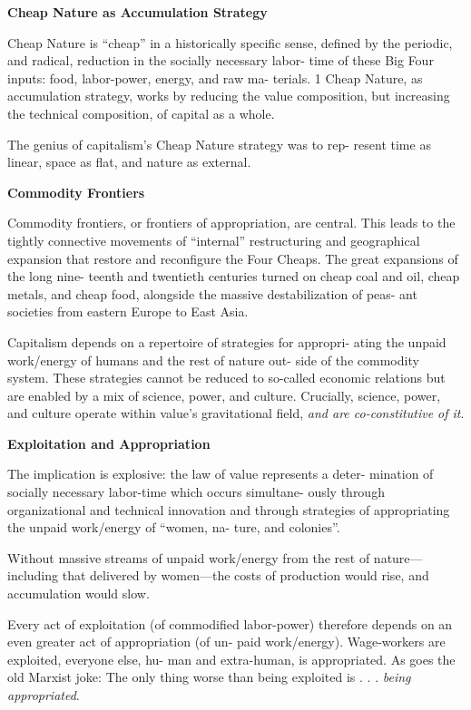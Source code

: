 \documentclass[
]{book}
\begin{document}
\textbf{Cheap Nature as Accumulation Strategy}

Cheap Nature is ``cheap'' in a historically specific sense, defined
by the periodic, and radical, reduction in the socially necessary labor-
time of these Big Four inputs: food, labor-power, energy, and raw ma-
terials. 1 Cheap Nature, as accumulation strategy, works by reducing
the value composition, but increasing the technical composition, of
capital as a whole.

The genius of capitalism's Cheap Nature strategy was to rep-
resent time as linear, space as flat, and nature as external.

\textbf{Commodity Frontiers}

Commodity frontiers, or frontiers of appropriation, are central.
This leads to the tightly connective movements of
``internal'' restructuring and geographical expansion that restore and
reconfigure the Four Cheaps. The great expansions of the long nine-
teenth and twentieth centuries turned on cheap coal and oil, cheap
metals, and cheap food, alongside the massive destabilization of peas-
ant societies from eastern Europe to East Asia.

Capitalism depends on a repertoire of strategies for appropri-
ating the unpaid work/energy of humans and the rest of nature out-
side of the commodity system. These strategies cannot be reduced to
so-called economic relations but are enabled by a mix of science,
power, and culture. Crucially, science, power, and culture operate
within value's gravitational field, \emph{and are co-constitutive of it}.

\textbf{Exploitation and Appropriation}

The implication is explosive: the law of value represents a deter-
mination of socially necessary labor-time which occurs simultane-
ously through organizational and technical innovation and through
strategies of appropriating the unpaid work/energy of ``women, na-
ture, and colonies''.

Without massive streams of unpaid work/energy from the rest of
nature---including that delivered by women---the costs of production would rise,
and accumulation would slow.

Every act of exploitation (of commodified labor-power)
therefore depends on an even greater act of appropriation (of un-
paid work/energy). Wage-workers are exploited, everyone else, hu-
man and extra-human, is appropriated. As goes the old Marxist joke:
The only thing worse than being exploited is . . . \emph{being appropriated}.
\end{document}
